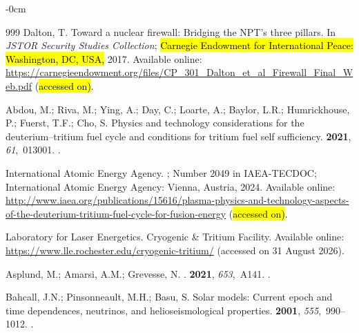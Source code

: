 \documentclass[particles,article,accept,pdftex,moreauthors]{Definitions/mdpi}
\begin{document}
\begin{adjustwidth}{-\extralength}{0cm}
\begin{thebibliography}{999}
Dalton, T.
\newblock Toward a nuclear firewall: Bridging the NPT’s three pillars.
\newblock In {\em JSTOR Security Studies Collection}; \hl{Carnegie Endowment for International Peace:  Washington, DC, USA,} %
 2017.
\newblock
Available online:  \url{https://carnegieendowment.org/files/CP_301_Dalton_et_al_Firewall_Final_Web.pdf} (\hl{accessed on)}.

Abdou, M.; Riva, M.;  Ying, A.; Day, C.; Loarte, A.; Baylor, L.R.; Humrickhouse, P.; Fuerst, T.F.; Cho, S.
\newblock Physics and technology considerations for the deuterium--tritium fuel
  cycle and conditions for tritium fuel self sufficiency.
 {\bf 2021}, {\em 61},~013001.
.

{International Atomic Energy Agency}.
; Number 2049 in IAEA-TECDOC; {International
  Atomic Energy Agency}: Vienna,  Austria, 2024.
\newblock
Available online:   \url{http://www.iaea.org/publications/15616/plasma-physics-and-technology-aspects-of-the-deuterium-tritium-fuel-cycle-for-fusion-energy} (\hl{accessed on)}.

{Laboratory for Laser Energetics}.
\newblock Cryogenic \& Tritium Facility.
\newblock Available online:  \url{https://www.lle.rochester.edu/cryogenic-tritium/}
\newblock  (accessed on 31 August 2026).

{Asplund}, M.; {Amarsi}, A.M.;  Grevesse, N.
.
 {\bf 2021}, {\em 653},~A141.
.

Bahcall, J.N.; Pinsonneault, M.H.;  Basu, S.
\newblock Solar models: Current epoch and time dependences, neutrinos, and
  helioseismological properties.
 {\bf 2001}, {\em 555},~990--1012.
.


\end{thebibliography}
\end{adjustwidth}
\end{document}
